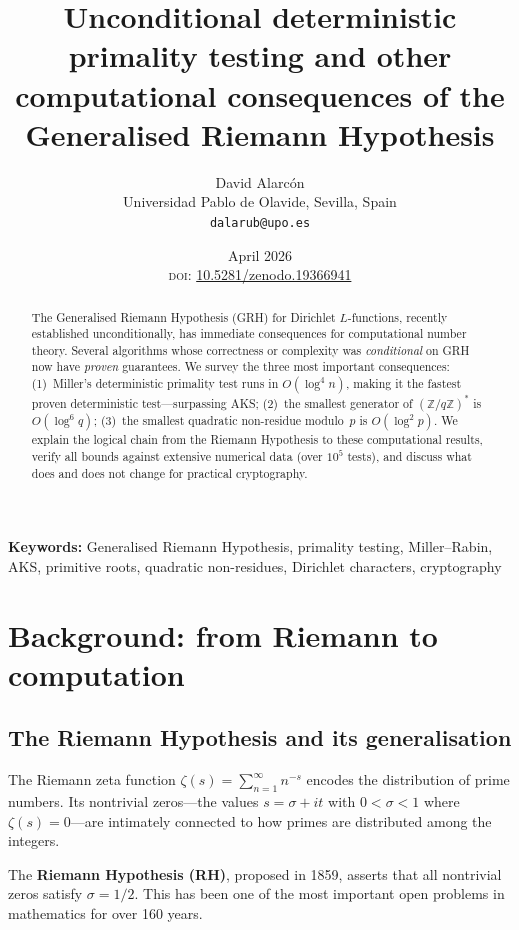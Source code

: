\documentclass[11pt]{article}
\title{\textbf{Unconditional deterministic primality testing and other\\
computational consequences of the Generalised Riemann Hypothesis}}
\author{David Alarc\'on\\
\small Universidad Pablo de Olavide, Sevilla, Spain\\
\small \texttt{dalarub@upo.es}}
\date{April 2026\\[2pt]
\small \textsc{doi}: \href{https://doi.org/10.5281/zenodo.19366941}{10.5281/zenodo.19366941}}
\theoremstyle{plain}
\theoremstyle{definition}
\theoremstyle{remark}
\begin{document}
\maketitle

\begin{abstract}
The Generalised Riemann Hypothesis (GRH) for Dirichlet $L$-functions,
recently established unconditionally, has immediate consequences for
computational number theory. Several algorithms whose correctness or
complexity was \emph{conditional} on GRH now have \emph{proven}
guarantees. We survey the three most important consequences:
(1)~Miller's deterministic primality test runs in $O(\log^4 n)$,
making it the fastest proven deterministic test---surpassing AKS;
(2)~the smallest generator of $(\mathbb{Z}/q\mathbb{Z})^*$ is
$O(\log^6 q)$; (3)~the smallest quadratic non-residue modulo~$p$ is
$O(\log^2 p)$. We explain the logical chain from the Riemann Hypothesis
to these computational results, verify all bounds against extensive
numerical data (over $10^5$ tests), and discuss what does and does not
change for practical cryptography.
\end{abstract}

\bigskip
\noindent\textbf{Keywords:} Generalised Riemann Hypothesis, primality
testing, Miller--Rabin, AKS, primitive roots, quadratic non-residues,
Dirichlet characters, cryptography

\bigskip

\section{Background: from Riemann to computation}

\subsection{The Riemann Hypothesis and its generalisation}

The Riemann zeta function $\zeta(s) = \sum_{n=1}^\infty n^{-s}$ encodes
the distribution of prime numbers. Its nontrivial zeros---the values
$s = \sigma + it$ with $0 < \sigma < 1$ where $\zeta(s) = 0$---are
intimately connected to how primes are distributed among the integers.

The \textbf{Riemann Hypothesis (RH)}, proposed in 1859, asserts that
all nontrivial zeros satisfy $\sigma = 1/2$. This has been one of the
most important open problems in mathematics for over 160 years.
\end{document}
